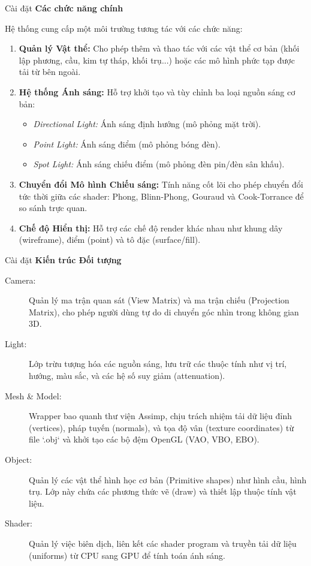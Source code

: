 \documentclass[11pt, aspectratio=169]{beamer}
\begin{document}
\begin{frame}{Cài đặt}
	\textbf{Các chức năng chính}
	
	Hệ thống cung cấp một môi trường tương tác với các chức năng:
	\begin{enumerate}
		\item \textbf{Quản lý Vật thể:} Cho phép thêm và thao tác với các vật thể cơ bản (khối lập phương, cầu, kim tự tháp, khối trụ...) hoặc các mô hình phức tạp được tải từ bên ngoài.
		
		\item \textbf{Hệ thống Ánh sáng:} Hỗ trợ khởi tạo và tùy chỉnh ba loại nguồn sáng cơ bản:
		\begin{itemize}
			\item \textit{Directional Light:} Ánh sáng định hướng (mô phỏng mặt trời).
			
			\item \textit{Point Light:} Ánh sáng điểm (mô phỏng bóng đèn).
			
			\item \textit{Spot Light:} Ánh sáng chiếu điểm (mô phỏng đèn pin/đèn sân khấu).
		\end{itemize}
		
		\item \textbf{Chuyển đổi Mô hình Chiếu sáng:} Tính năng cốt lõi cho phép chuyển đổi tức thời giữa các shader: Phong, Blinn-Phong, Gouraud và Cook-Torrance để so sánh trực quan.
		
		\item \textbf{Chế độ Hiển thị:} Hỗ trợ các chế độ render khác nhau như khung dây (wireframe), điểm (point) và tô đặc (surface/fill).
	\end{enumerate}
\end{frame}
	
\begin{frame}{Cài đặt}
	\textbf{Kiến trúc Đối tượng}
	
	\begin{description}
		\item[Camera:] Quản lý ma trận quan sát (View Matrix) và ma trận chiếu (Projection Matrix), cho phép người dùng tự do di chuyển góc nhìn trong không gian 3D.
		\item[Light:] Lớp trừu tượng hóa các nguồn sáng, lưu trữ các thuộc tính như vị trí, hướng, màu sắc, và các hệ số suy giảm (attenuation).
		\item[Mesh \& Model:] Wrapper bao quanh thư viện Assimp, chịu trách nhiệm tải dữ liệu đỉnh (vertices), pháp tuyến (normals), và tọa độ vân (texture coordinates) từ file `.obj` và khởi tạo các bộ đệm OpenGL (VAO, VBO, EBO).
		\item[Object:] Quản lý các vật thể hình học cơ bản (Primitive shapes) như hình cầu, hình trụ. Lớp này chứa các phương thức vẽ (draw) và thiết lập thuộc tính vật liệu.
		\item[Shader:] Quản lý việc biên dịch, liên kết các shader program và truyền tải dữ liệu (uniforms) từ CPU sang GPU để tính toán ánh sáng.
	\end{description}
\end{frame}
\end{document}
